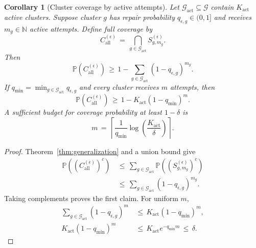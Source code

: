 \documentclass{article} %
\newtheorem{corollary}[theorem]{Corollary}
\begin{document}
\begin{corollary}[Cluster coverage by active attempts]
\label{cor:app-specialist-coverage}
Let \(\mathcal G_{\mathrm{act}}\subseteq\mathcal G\) contain
\(K_{\mathrm{act}}\) active clusters.  Suppose cluster \(g\) has repair
probability \(q_{\epsilon,g}\in(0,1]\) and receives \(m_g\in\mathbb N\) active
attempts.  Define full coverage by
\begin{equation}
C_{\mathrm{all}}^{(\epsilon)}
\,=\,
\bigcap_{g\in\mathcal{G}_{\mathrm{act}}}
S_{g,m_g}^{(\epsilon)}.
\end{equation}
Then
\begin{equation}
\mathbb{P}\!\left(
C_{\mathrm{all}}^{(\epsilon)}
\right)
\,\geq\,
1-
\sum_{g\in\mathcal{G}_{\mathrm{act}}}
(1-q_{\epsilon,g})^{m_g}.
\end{equation}
If \(q_{\min}=\min_{g\in\mathcal G_{\mathrm{act}}}q_{\epsilon,g}\) and every
cluster receives \(m\) attempts, then
\begin{equation}
\mathbb{P}\!\left(
C_{\mathrm{all}}^{(\epsilon)}
\right)
\,\geq\,
1-
K_{\mathrm{act}}(1-q_{\min})^{m}.
\end{equation}
A sufficient budget for coverage probability at least \(1-\delta\) is
\begin{equation}
m
\,=\,
\left\lceil
\frac{1}{q_{\min}}
\log\!\left(\frac{K_{\mathrm{act}}}{\delta}\right)
\right\rceil .
\end{equation}
\end{corollary}

\begin{proof}
Theorem~\ref{thm:generalization} and a union bound give
\begin{equation}
\begin{aligned}
\mathbb{P}\!\left(
\left(C_{\mathrm{all}}^{(\epsilon)}\right)^c
\right)
&\,\leq\,
\sum_{g\in\mathcal{G}_{\mathrm{act}}}
\mathbb{P}\!\left(
\left(S_{g,m_g}^{(\epsilon)}\right)^c
\right)
\\
&\,\leq\,
\sum_{g\in\mathcal{G}_{\mathrm{act}}}
(1-q_{\epsilon,g})^{m_g}.
\end{aligned}
\end{equation}
Taking complements proves the first claim.  For uniform \(m\),
\begin{equation}
\begin{aligned}
\sum_{g\in\mathcal{G}_{\mathrm{act}}}
(1-q_{\epsilon,g})^{m}
&\,\leq\,K_{\mathrm{act}}(1-q_{\min})^m, \\
K_{\mathrm{act}}(1-q_{\min})^{m}
&\,\leq\,K_{\mathrm{act}}e^{-q_{\min}m}
\,\leq\,\delta.
\end{aligned}
\end{equation}
\end{proof}
\end{document}

